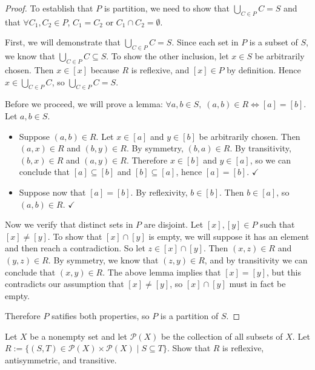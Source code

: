 \documentclass[12pt]{article}
\newcommand{\Pset}[1]{\mathcal{P}(#1)}
\newenvironment{ex}[2][Problem]{\begin{trivlist}
\item[\hskip \labelsep {\bfseries #1}\hskip \labelsep {\bfseries #2.}]}{\end{trivlist}}
\begin{document}
\begin{proof}
    To establish that $P$ is partition, we need to show that $\bigcup_{C\in P}C = S$
    and that $\forall C_1, C_2 \in P$, $C_1=C_2$ or  $C_1\cap C_2 = \emptyset$.

    First, we will demonstrate that $\bigcup_{C\in P}C = S$. Since each set in $P$ is
    a subset of $S$, we know that $\bigcup_{C\in P}C \subseteq S$. To show the other
    inclusion, let $x\in S$ be arbitrarily chosen. Then $x\in[x]$ because $R$ is reflexive,
    and $[x] \in P$ by definition. Hence $x\in\bigcup_{C\in P}C$, so
    $\bigcup_{C\in P}C = S$.

    Before we proceed, we will prove a lemma:
    $
        \forall a,b\in S,\; (a, b)\in R \iff [a]=[b]
    $.
    Let $a, b\in S$. \begin{itemize}
        \item[$(\implies)$] Suppose $(a, b)\in R$. Let $x\in[a]$ and $y\in[b]$ be
            arbitrarily chosen. Then $(a, x) \in R$ and $(b, y) \in R$.
            By symmetry, $(b, a)\in R$. By transitivity, $(b, x)\in R$ and
            $(a, y)\in R$. Therefore $x\in [b]$ and $y\in [a]$, so we can conclude
            that $[a]\subseteq[b]$ and $[b]\subseteq[a]$, hence $[a]=[b]$. $\checkmark$
        \item[$(\impliedby)$] Suppose now that $[a]=[b]$. By reflexivity, $b\in[b]$.
            Then $b\in[a]$, so $(a, b)\in R$. $\checkmark$
    \end{itemize}

    Now we verify that distinct sets in $P$ are disjoint. Let $[x], [y]\in P$ such that
    $[x]\neq [y]$. To show that $[x]\cap[y]$ is empty, we will suppose it has an element
    and then reach a contradiction. So let $z\in[x]\cap[y]$. Then $(x,z)\in R$ and
    $(y,z)\in R$. By symmetry, we know that $(z,y)\in R$, and by transitivity we
    can conclude that $(x,y)\in R$. The above lemma implies that $[x]=[y]$, but this
    contradicts our assumption that $[x]\neq[y]$, so $[x]\cap[y]$ must in fact be empty.

    Therefore $P$ satifies both properties, so $P$ is a partition of $S$.


\end{proof}


\begin{ex}{4} [Subset]
    Let $X$ be a nonempty set and let $\Pset{X}$ be the collection of all
    subsets of $X$. Let $R := \{(S,T)\in\Pset{X}\times\Pset{X} \;|\; S \subseteq T\}$.
    Show that $R$ is reflexive, antisymmetric, and transitive.
\end{ex}
\end{document}
